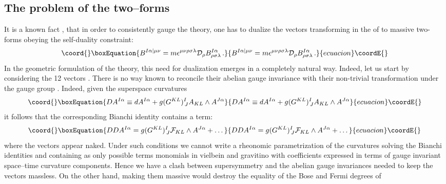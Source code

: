 \documentclass[a4paper,12pt]{article}
\begin{document}
\subsection{The problem of the two--forms}
It is a known fact \cite{PPV}, \cite{gunwar} that in order to
consistently gauge the \coordHE{} theory, one has to dualize
the vectors transforming in the \coordHE{} of
\coordHE{} to massive two-forms
obeying the self-duality constraint:
\begin{equation}\coord{}\boxEquation{
B^{I\alpha |\mu\nu} = m
\epsilon^{\mu\nu\rho\sigma\lambda}{\cal{D}}_\rho
B^{I\alpha}_{\rho\sigma\lambda}\,. \label{self}
}{
B^{I\alpha |\mu\nu} = m
\epsilon^{\mu\nu\rho\sigma\lambda}{\cal{D}}_\rho
B^{I\alpha}_{\rho\sigma\lambda}\,. }{ecuacion}\coordE{}\end{equation}
In the geometric formulation of the theory, this need for
dualization emerges in a completely natural way. Indeed, let us
start by considering the 12 vectors \coordHE{}. There is no way
known to reconcile their abelian gauge invariance with their
non-trivial transformation under the gauge group \coordHE{}.
Indeed, given the superspace curvatures
\begin{equation}\coord{}\boxEquation{
 DA^{I\alpha} \equiv dA^{I\alpha}+g(G^{KL})^I_{\,J}A_{KL}\wedge A^{J\alpha}
}{
 DA^{I\alpha} \equiv dA^{I\alpha}+g(G^{KL})^I_{\,J}A_{KL}\wedge A^{J\alpha}
}{ecuacion}\coordE{}\end{equation}
it follows that the corresponding Bianchi identity contains a
term:
\begin{equation}\coord{}\boxEquation{
DDA^{I\alpha} = g(G^{KL})^I_{\,J}{\cal F}_{KL}\wedge
A^{J\alpha}+\dots
}{
DDA^{I\alpha} = g(G^{KL})^I_{\,J}{\cal F}_{KL}\wedge
A^{J\alpha}+\dots
}{ecuacion}\coordE{}\end{equation}
where the vectors \coordHE{} appear naked. Under such
conditions we cannot write a rheonomic parametrization of the
curvatures solving the Bianchi identities and containing as only
possible terms monomials in vielbein and gravitino with
coefficients expressed in terms of gauge invariant space--time
curvature components. Hence we have a clash between supersymmetry
and the \coordHE{} abelian gauge invariances needed to keep the vectors
\coordHE{} massless. On the other hand, making them massive
would destroy the equality of the Bose and Fermi degrees of
\end{document}

